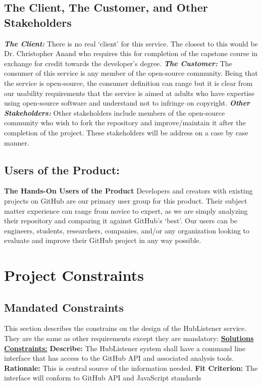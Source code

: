 \documentclass{article}
\begin{document}
\subsection{The Client, The Customer, and Other Stakeholders}
\textbf{\textit{The Client:}}
There is no real `client' for this service. The closest to this would be Dr. Christopher Anand who requires this for completion of the capstone course in exchange for credit towards the developer’s degree. \newline
\textbf{\textit{The Customer:}}
The consumer of this service is any member of the open-source community. Being that the service is open-source, the consumer definition can range but it is clear from our usability requirements that the service is aimed at adults who have expertise using open-source software and understand not to infringe on copyright. \newline
\textbf{\textit{Other Stakeholders:}}
Other stakeholders include members of the open-source community who wish to fork the repository and improve/maintain it after the completion of the project. These stakeholders will be address on a case by case manner. \newline

\subsection{Users of the Product:}
\textbf{The Hands-On Users of the Product}
\newline
Developers and creators with existing projects on GitHub are our primary user group for this product. Their subject matter experience can range from novice to expert, as we are simply analyzing their repository and comparing it against GitHub’s ‘best’. Our users can be engineers, students, researchers, companies, and/or any organization looking to evaluate and improve their GitHub project in any way possible. 
\newpage


\section{Project Constraints}
\subsection{Mandated Constraints}

This section describes the constrains on the design of the HubListener service. They are the same as other requirements except they are mandatory:\newline
\newline
\iffalse %
\noindent
\textbf{\underline{Solutions Constraints:}}\newline
\textbf{Describe:} The HubListener system shall have a command line interface that has access to the GitHub API and associated analysis tools.\newline
\textbf{Rationale:} This is central source of the information needed. \newline
\textbf{Fit Criterion:} The interface will conform to GitHub API and JavaScript standards \newline
\end{document}
